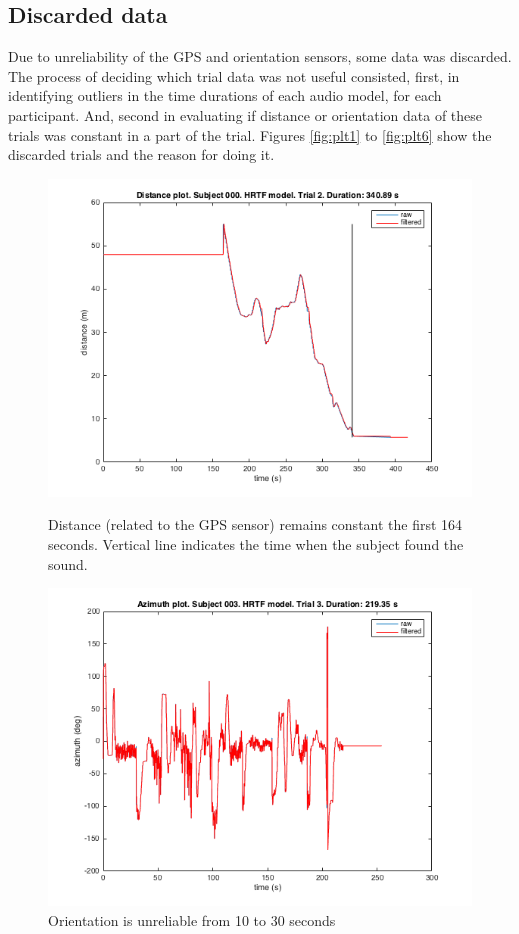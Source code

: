 \documentclass[journal]{IEEEtran}
\begin{document}
\begin{appendices}
\section{Discarded data}

Due to unreliability of the GPS and orientation sensors, some data was discarded. The process of deciding which trial data was not useful consisted, first, in identifying outliers in the time durations of each audio model, for each participant. And, second in evaluating if distance or orientation data of these trials was constant in a part of the trial. Figures \ref{fig:plt1} to \ref{fig:plt6} show the discarded trials and the reason for doing it.

\begin{figure}[h!]
  \centering
    \includegraphics[scale=0.45]{graphics/subject000htrftrial2.png}
   \caption{Distance (related to the GPS sensor) remains constant the first 164 seconds. Vertical line indicates the time when the subject found the sound.}
     \label{fig:plt1}
       \includegraphics[scale=0.45]{graphics/subject003htrftrial3.png}
  \caption{Orientation is unreliable from 10 to 30 seconds}
  \label{fig:plt2}
\end{figure}


\end{appendices}
\end{document}
